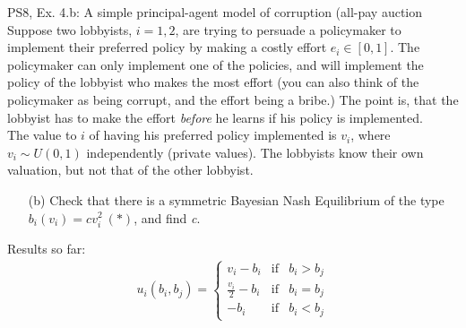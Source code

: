 \begin{frame}{PS8, Ex. 4.b: A simple principal-agent model of corruption (all-pay auction}
    Suppose two lobbyists, $i = 1, 2$, are trying to persuade a policymaker to implement their preferred policy by making a costly effort $e_i\in[0, 1]$. The policymaker can only implement one of the policies, and will implement the policy of the lobbyist who makes the most effort (you can also think of the policymaker as being corrupt, and the effort being a bribe.) The point is, that the lobbyist has to make the effort \textit{before} he learns if his policy is implemented.\\\medskip
    The value to $i$ of having his preferred policy implemented is $v_i$, where $v_i\sim U(0, 1)$ independently (private values). The lobbyists know their own valuation, but not that of the other lobbyist.
    \begin{itemize}
      \item[(b)] Check that there is a symmetric Bayesian Nash Equilibrium of the type $b_i(v_i) = cv_i^2\ (*)$, and find \textit{c}.
    \end{itemize} \vspace{-8pt}
    \begin{multicols}{2}
      \vfill\null\columnbreak
      Results so far: \vspace{-6pt}
      \begin{align*}
        u_i(b_i,b_j)=\left\{\begin{array}{lcl}
          v_i-b_i           & \text{if} & b_i>b_j \\
          \frac{v_i}{2}-b_i & \text{if} & b_i=b_j \\
          -b_i              & \text{if} & b_i<b_j
        \end{array}\right.
      \end{align*}
      \vfill\null
    \end{multicols}
\end{frame}
